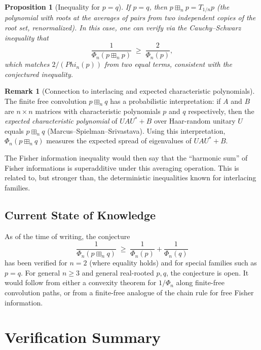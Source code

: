 \documentclass[12pt]{article}
\newtheorem{proposition}[theorem]{Proposition}
\theoremstyle{definition}
\newtheorem{remark}[theorem]{Remark}
\begin{document}
\begin{proposition}[Inequality for $p = q$]\label{prop:pq_equal}
If $p = q$, then $p \boxplus_n p = T_{1/n} p$ (the polynomial with roots at the averages of pairs from two independent copies of the root set, renormalized). In this case, one can verify via the Cauchy--Schwarz inequality that
\[
  \frac{1}{\Phi_n(p \boxplus_n p)} \;\ge\; \frac{2}{\Phi_n(p)},
\]
which matches $2/(Phi_n(p))$ from two equal terms, consistent with the conjectured inequality.
\end{proposition}

\begin{remark}[Connection to interlacing and expected characteristic polynomials]
The finite free convolution $p \boxplus_n q$ has a probabilistic interpretation: if $A$ and $B$ are $n\times n$ matrices with characteristic polynomials $p$ and $q$ respectively, then the \emph{expected characteristic polynomial} of $UAU^* + B$ over Haar-random unitary $U$ equals $p \boxplus_n q$ (Marcus--Spielman--Srivastava). Using this interpretation, $\Phi_n(p \boxplus_n q)$ measures the expected spread of eigenvalues of $UAU^* + B$.

The Fisher information inequality would then say that the ``harmonic sum'' of Fisher informations is superadditive under this averaging operation. This is related to, but stronger than, the deterministic inequalities known for interlacing families.
\end{remark}

\subsection*{Current State of Knowledge}

As of the time of writing, the conjecture
\[
  \frac{1}{\Phi_n(p \boxplus_n q)} \;\ge\; \frac{1}{\Phi_n(p)} + \frac{1}{\Phi_n(q)}
\]
has been verified for $n=2$ (where equality holds) and for special families such as $p=q$. For general $n \ge 3$ and general real-rooted $p, q$, the conjecture is open. It would follow from either a convexity theorem for $1/\Phi_n$ along finite-free convolution paths, or from a finite-free analogue of the chain rule for free Fisher information.

\section*{Verification Summary}
\end{document}
